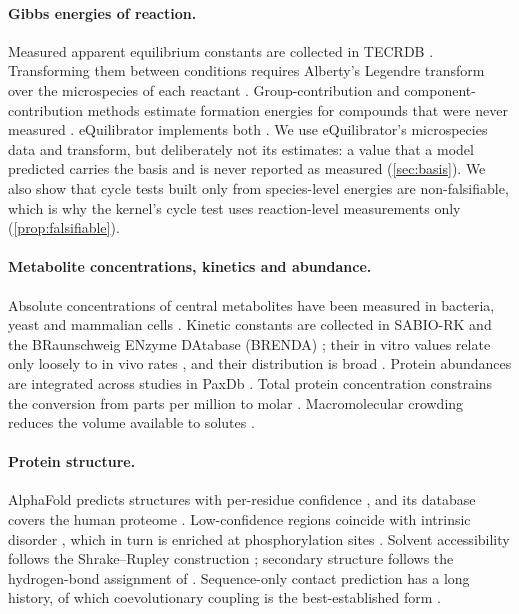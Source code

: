 \paragraph{Gibbs energies of reaction.}
Measured apparent equilibrium constants are collected in TECRDB \citep{goldberg2004tecrdb}.
Transforming them between conditions requires Alberty's Legendre transform over the microspecies of each reactant \citep{alberty1998calculation,alberty2003thermodynamics}.
Group-contribution and component-contribution methods estimate formation energies for compounds that were never measured \citep{jankowski2008group,noor2013component}.
eQuilibrator implements both \citep{flamholz2012equilibrator,beber2022equilibrator}.
We use eQuilibrator's microspecies data and transform, but deliberately not its estimates: a value that a model predicted carries the basis  and is never reported as measured (\cref{sec:basis}).
We also show that cycle tests built only from species-level energies are non-falsifiable, which is why the kernel's cycle test uses reaction-level measurements only (\cref{prop:falsifiable}).

\paragraph{Metabolite concentrations, kinetics and abundance.}
Absolute concentrations of central metabolites have been measured in bacteria, yeast and mammalian cells \citep{bennett2009absolute,park2016concentrations}.
Kinetic constants are collected in SABIO-RK and the BRaunschweig ENzyme DAtabase (BRENDA) \citep{wittig2012sabio,chang2021brenda}; their in vitro values relate only loosely to in vivo rates \citep{davidi2016global}, and their distribution is broad \citep{bareven2011moderately}.
Protein abundances are integrated across studies in PaxDb \citep{wang2015paxdb}.
Total protein concentration constrains the conversion from parts per million to molar \citep{milo2013protein}.
Macromolecular crowding reduces the volume available to solutes \citep{minton2001crowding,zhou2008crowding}.

\paragraph{Protein structure.}
AlphaFold predicts structures with per-residue confidence \citep{jumper2021alphafold}, and its database covers the human proteome \citep{tunyasuvunakool2021human,varadi2022afdb}.
Low-confidence regions coincide with intrinsic disorder \citep{ruff2021alphafold}, which in turn is enriched at phosphorylation sites \citep{iakoucheva2004disorder}.
Solvent accessibility follows the Shrake--Rupley construction \citep{shrake1973environment}; secondary structure follows the hydrogen-bond assignment of \citet{kabsch1983dssp}.
Sequence-only contact prediction has a long history, of which coevolutionary coupling is the best-established form \citep{morcos2011dca}.

